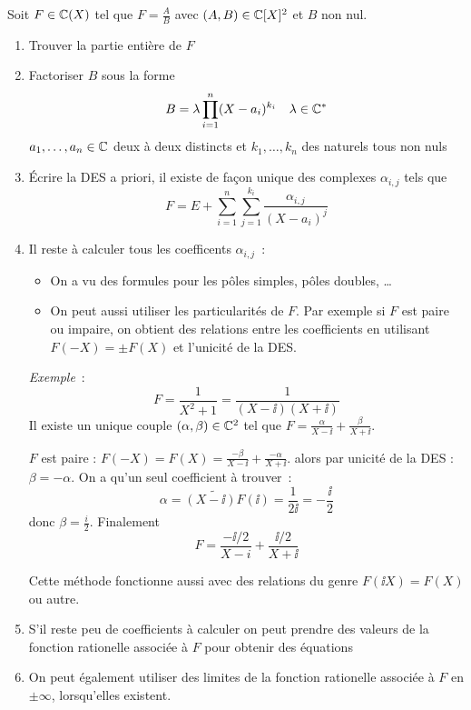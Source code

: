 Soit \(F \in \mathbb{C}(X)\) tel que \(F=\frac{A}{B}\) avec \((A,B)\in\mathbb{C}[X]^2\) et \(B\) non nul.
\begin{enumerate}
\item Trouver la partie entière de \(F\)
\item Factoriser \(B\) sous la forme
  \begin{equation}
    B=\lambda \prod_{i=1}^n(X-a_i)^{k_i} \quad \lambda \in \mathbb{C}^*
  \end{equation}
  \(a_1,\ldots,a_n \in \mathbb{C}\) deux à deux distincts et \(k_1, \ldots, k_n\) des naturels tous non nuls
\item Écrire la DES a priori, il existe de façon unique des complexes \(\alpha_{i,j}\) tels que
  \begin{equation}
    F=E+\sum_{i=1}^n\sum_{j=1}^{k_i} \frac{\alpha_{i,j}}{(X-a_i)^{j}}
  \end{equation}
\item Il reste à calculer tous les coefficents \(\alpha_{i,j}\)~:
  \begin{itemize}
  \item On a vu des formules pour les pôles simples, pôles doubles, \ldots
  \item On peut aussi utiliser les particularités de \(F\). Par exemple si \(F\) est paire ou impaire, on obtient des relations entre les coefficients en utilisant \(F(-X)=\pm F(X)\) et l'unicité de la DES.
  \end{itemize}

\emph{Exemple}~:
\begin{equation}
  F=\frac{1}{X^2+1}=\frac{1}{(X-\ii)(X+\ii)}
\end{equation}
Il existe un unique couple \((\alpha,\beta) \in \mathbb{C}^2\) tel que \(F=\frac{\alpha}{X-\ii}+\frac{\beta}{X+\ii}\).

\(F\) est paire : \(F(-X)=F(X)=\frac{-\beta}{X-\ii}+ \frac{-\alpha}{X+\ii}\). alors par unicité de la DES : \(\beta=-\alpha\). On a qu'un seul coefficient à trouver~:
\begin{equation}
  \alpha = \widetilde{(X-\ii)F}(\ii) = \frac{1}{2\ii} = -\frac{\ii}{2}
\end{equation}
donc \(\beta=\frac{i}{2}\). Finalement
\begin{equation}
  F = \frac{-\ii/2}{X-i}+\frac{\ii/2}{X+\ii}
\end{equation}

Cette méthode fonctionne aussi avec des relations du genre \(F(\ii X)=F(X)\) ou autre.
\item S'il reste peu de coefficients à calculer on peut prendre des valeurs de la fonction rationelle associée à \(F\) pour obtenir des équations
\item On peut également utiliser des limites de la fonction rationelle associée à \(F\) en \(\pm \infty\), lorsqu'elles existent.
\end{enumerate}

